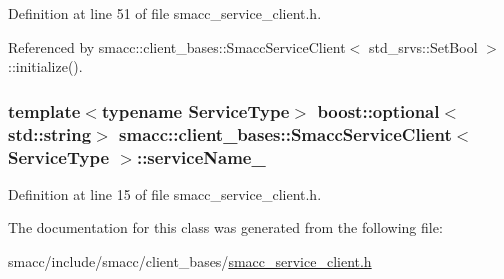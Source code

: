 Definition at line 51 of file smacc\+\_\+service\+\_\+client.\+h.



Referenced by smacc\+::client\+\_\+bases\+::\+Smacc\+Service\+Client$<$ std\+\_\+srvs\+::\+Set\+Bool $>$\+::initialize().

\subsubsection[{\texorpdfstring{service\+Name\+\_\+}{serviceName_}}]{\setlength{\rightskip}{0pt plus 5cm}template$<$typename Service\+Type$>$ boost\+::optional$<$std\+::string$>$ {\bf smacc\+::client\+\_\+bases\+::\+Smacc\+Service\+Client}$<$ Service\+Type $>$\+::service\+Name\+\_\+}\hypertarget{classsmacc_1_1client__bases_1_1SmaccServiceClient_a63732ec406cb8b6f65bbdbb73e01c7ab}{}\label{classsmacc_1_1client__bases_1_1SmaccServiceClient_a63732ec406cb8b6f65bbdbb73e01c7ab}


Definition at line 15 of file smacc\+\_\+service\+\_\+client.\+h.



The documentation for this class was generated from the following file\+:\begin{DoxyCompactItemize}
\item 
smacc/include/smacc/client\+\_\+bases/\hyperlink{smacc__service__client_8h}{smacc\+\_\+service\+\_\+client.\+h}\end{DoxyCompactItemize}
